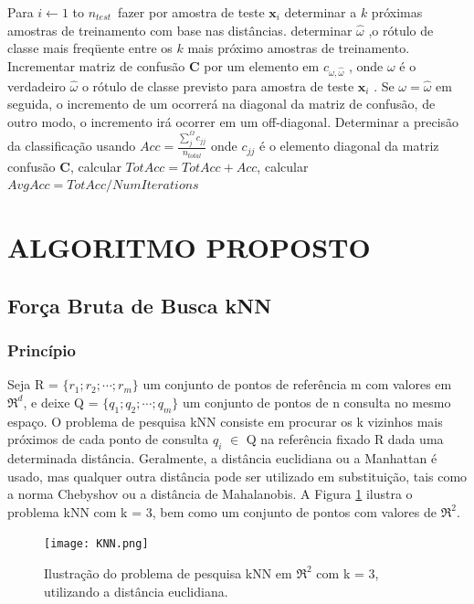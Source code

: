 \documentclass[letterpaper, 10 pt, conference]{ieeeconf}  %
\begin{document}
Para $i \leftarrow 1$ to $n_{test}$\ fazer por amostra de teste $\textbf{x}_i$ determinar a
$k$ próximas amostras de treinamento com base nas distâncias. determinar $\hat{\omega}$ ,o rótulo de classe mais freqüente entre os $k$ mais próximo amostras de treinamento. Incrementar matriz de confusão $\textbf{C}$ por um elemento em $c_{\omega,\hat{\omega}}$ , onde $\omega$ é o verdadeiro $\hat{\omega}$ o rótulo de classe previsto para amostra de teste $\textbf{x}_i$ . Se $\omega =\hat{\omega}$ em seguida, o incremento de um ocorrerá na diagonal da matriz de confusão, de outro modo, o incremento irá ocorrer em um off-diagonal.
Determinar a precisão da classificação usando $Acc = \frac{\sum_j^{\Omega}c_{jj}}{n_{total}}$ onde $c_{jj}$  é o elemento diagonal da matriz confusão $\textbf{C}$, calcular $TotAcc = TotAcc + Acc$, calcular $AvgAcc = TotAcc/NumIterations$

\section{ALGORITMO PROPOSTO}

\subsection{Força Bruta de Busca kNN}

\subsubsection{Princípio}

Seja R = $\{r_1; r_2; \cdots ; r_m\}$ um conjunto de pontos de referência m com valores em $\Re^d$, e deixe Q = $\{q_1; q_2; \cdots ; q_m\}$ um conjunto de pontos de n consulta no mesmo espaço. O problema de pesquisa kNN consiste em procurar os k vizinhos mais próximos de cada ponto de consulta $q_i$ $\in$ Q na referência fixado R dada uma determinada distância. Geralmente, a distância euclidiana ou a Manhattan é usado, mas qualquer outra distância pode ser utilizado em substituição, tais como a norma Chebyshov ou a distância de Mahalanobis. A Figura \ref{fig:Figura03} ilustra o problema kNN com k = 3, bem como um conjunto de pontos com valores de $\Re^2$.

\begin{figure}[H]
\centering

\texttt{[image: KNN.png]}

\caption{Ilustração do problema de pesquisa kNN em $\Re^2$ com k = 3, utilizando a distância euclidiana.}
\label{fig:Figura03}
\end{figure}
\end{document}
